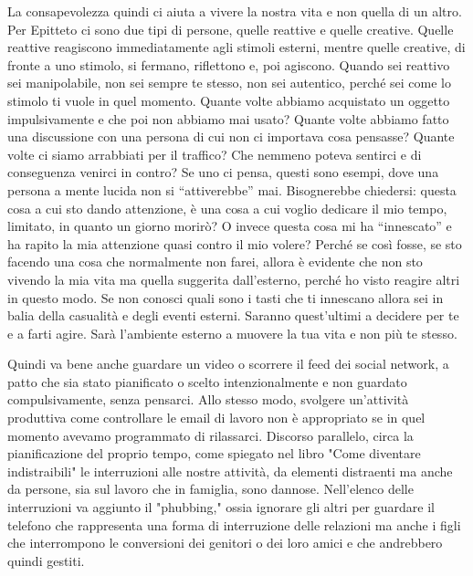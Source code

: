 \documentclass[12pt]{book} %
\begin{document}
La consapevolezza quindi ci aiuta a vivere la nostra vita e non quella di un altro.
Per Epitteto ci sono due tipi di persone, quelle reattive e quelle creative. Quelle reattive reagiscono immediatamente
agli stimoli esterni, mentre quelle creative, di fronte a uno stimolo, si fermano, riflettono e, poi agiscono. Quando
sei reattivo sei manipolabile, non sei sempre te stesso, non sei autentico, perché sei come lo stimolo ti vuole in quel
momento. Quante volte abbiamo acquistato un oggetto impulsivamente e che poi non abbiamo mai usato? Quante volte
abbiamo fatto una discussione con una persona di cui non ci importava cosa pensasse? Quante volte ci siamo arrabbiati
per il traffico? Che nemmeno poteva sentirci e di conseguenza venirci in contro? Se uno ci pensa, questi sono esempi,
dove una persona a mente lucida non si “attiverebbe” mai. Bisognerebbe chiedersi: questa cosa a cui sto dando
attenzione, è una cosa a cui voglio dedicare il mio tempo, limitato, in quanto un giorno morirò? O invece questa cosa
mi ha “innescato” e ha rapito la mia attenzione quasi contro il mio volere? Perché se così fosse, se sto facendo una
cosa che normalmente non farei, allora è evidente che non sto vivendo la mia vita ma quella suggerita
dall'esterno, perché ho visto reagire altri in questo modo. Se non conosci quali sono i tasti che ti innescano
allora sei in balia della casualità e degli eventi esterni. Saranno quest'ultimi a decidere per te
e a farti agire. Sarà l'ambiente esterno a muovere la tua vita e non più te stesso. 

Quindi va bene anche guardare un video o scorrere il feed dei social network, a patto che sia stato pianificato o scelto intenzionalmente e non guardato compulsivamente, senza pensarci. Allo stesso modo, svolgere un’attività produttiva come controllare le email di lavoro non è appropriato se in quel momento avevamo programmato di rilassarci. Discorso parallelo, circa la pianificazione del proprio tempo, come spiegato nel libro "Come diventare indistraibili"  le interruzioni alle nostre attività, da elementi distraenti ma anche da persone, sia sul lavoro che in famiglia, sono dannose. Nell'elenco delle interruzioni va aggiunto il "phubbing," ossia ignorare gli altri per guardare il telefono che rappresenta una forma di interruzione delle relazioni ma anche i figli che interrompono le conversioni dei genitori o dei loro amici e che andrebbero quindi gestiti.
\end{document}
